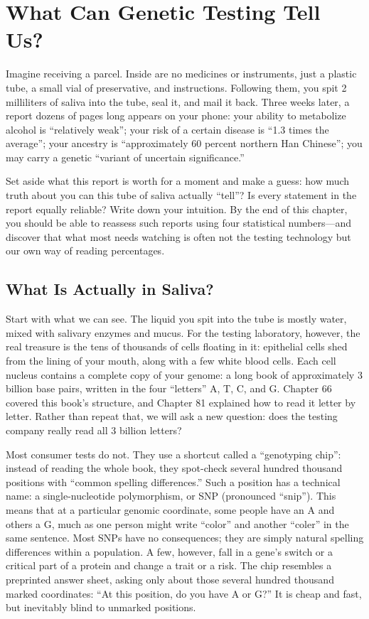 \chapter{What Can Genetic Testing Tell Us?}

\begin{kaichang}
Imagine receiving a parcel. Inside are no medicines or instruments, just a plastic tube, a small vial of preservative, and instructions. Following them, you spit 2 milliliters of saliva into the tube, seal it, and mail it back. Three weeks later, a report dozens of pages long appears on your phone: your ability to metabolize alcohol is ``relatively weak''; your risk of a certain disease is ``1.3 times the average''; your ancestry is ``approximately 60 percent northern Han Chinese''; you may carry a genetic ``variant of uncertain significance.''

Set aside what this report is worth for a moment and make a guess: how much truth about you can this tube of saliva actually ``tell''? Is every statement in the report equally reliable? Write down your intuition. By the end of this chapter, you should be able to reassess such reports using four statistical numbers---and discover that what most needs watching is often not the testing technology but our own way of reading percentages.
\end{kaichang}

\section{What Is Actually in Saliva?}

Start with what we can see. The liquid you spit into the tube is mostly water, mixed with salivary enzymes and mucus. For the testing laboratory, however, the real treasure is the tens of thousands of cells floating in it: epithelial cells shed from the lining of your mouth, along with a few white blood cells. Each cell nucleus contains a complete copy of your genome: a long book of approximately 3 billion base pairs, written in the four ``letters'' A, T, C, and G. Chapter 66 covered this book's structure, and Chapter 81 explained how to read it letter by letter. Rather than repeat that, we will ask a new question: does the testing company really read all 3 billion letters?

Most consumer tests do not. They use a shortcut called a ``genotyping chip'': instead of reading the whole book, they spot-check several hundred thousand positions with ``common spelling differences.'' Such a position has a technical name: a single-nucleotide polymorphism, or SNP (pronounced ``snip''). This means that at a particular genomic coordinate, some people have an A and others a G, much as one person might write ``color'' and another ``coler'' in the same sentence. Most SNPs have no consequences; they are simply natural spelling differences within a population. A few, however, fall in a gene's switch or a critical part of a protein and change a trait or a risk. The chip resembles a preprinted answer sheet, asking only about those several hundred thousand marked coordinates: ``At this position, do you have A or G?'' It is cheap and fast, but inevitably blind to unmarked positions.

